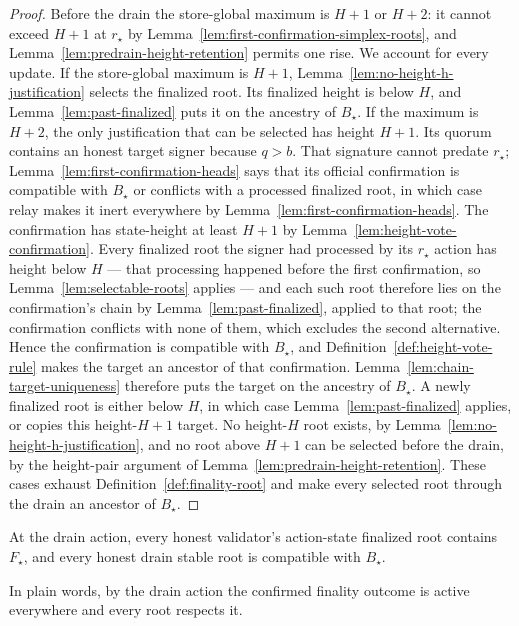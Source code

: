 \begin{proof}
Before the drain the store-global maximum is \(H+1\) or \(H+2\):
it cannot exceed \(H+1\) at \(r_\star\) by
Lemma~\ref{lem:first-confirmation-simplex-roots}, and
Lemma~\ref{lem:predrain-height-retention} permits one rise.  We account
for every update.
If the store-global maximum is \(H+1\),
Lemma~\ref{lem:no-height-h-justification} selects the finalized root.  Its finalized
height is below \(H\), and Lemma~\ref{lem:past-finalized} puts it on the
ancestry of \(B_\star\).  If the maximum is \(H+2\), the only justification
that can be selected has height \(H+1\).  Its quorum contains an honest
target signer because \(q>b\).  That signature cannot predate \(r_\star\);
Lemma~\ref{lem:first-confirmation-heads} says that its official confirmation
is compatible with \(B_\star\) or conflicts with a processed finalized
root, in which case relay makes it inert everywhere by
Lemma~\ref{lem:first-confirmation-heads}.
The confirmation has state-height at least \(H+1\) by
Lemma~\ref{lem:height-vote-confirmation}.  Every finalized root the
signer had processed by its \(r_\star\) action has height below
\(H\) --- that processing happened before the first confirmation, so
Lemma~\ref{lem:selectable-roots} applies --- and each such root
therefore lies on the confirmation's chain by
Lemma~\ref{lem:past-finalized}, applied to that root; the confirmation
conflicts with none of them, which excludes the second alternative.  Hence the
confirmation is compatible with \(B_\star\), and
Definition~\ref{def:height-vote-rule} makes the target an ancestor of that
confirmation.  Lemma~\ref{lem:chain-target-uniqueness} therefore puts the
target on the ancestry of \(B_\star\).  A newly finalized root is either
below \(H\), in which case Lemma~\ref{lem:past-finalized} applies, or copies
this height-\(H+1\) target.  No height-\(H\) root exists, by
Lemma~\ref{lem:no-height-h-justification}, and no root above \(H+1\) can be selected
before the drain, by the height-pair argument of
Lemma~\ref{lem:predrain-height-retention}.  These cases exhaust Definition~\ref{def:finality-root} and
make every selected root through the drain an ancestor of \(B_\star\).
\end{proof}

\begin{lemma}
\label{lem:drain-stable-roots}
At the drain action, every honest validator's action-state finalized
root contains \(F_\star\), and every honest drain stable root is
compatible with \(B_\star\).

In plain words, by the drain action the confirmed finality outcome is
active everywhere and every root respects it.
\end{lemma}

